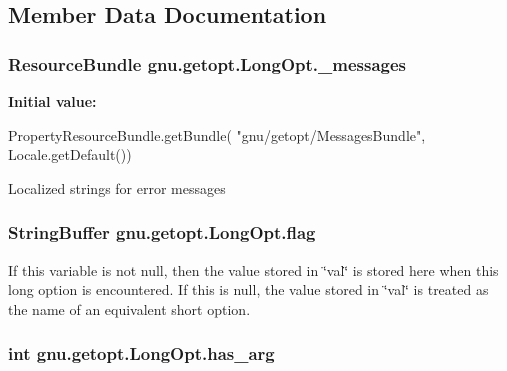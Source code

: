 \subsection{Member Data Documentation}
\hypertarget{classgnu_1_1getopt_1_1_long_opt_af5966405b1f9dff812b8ee0641a4c13f}{
\subsubsection[{\_\-messages}]{\setlength{\rightskip}{0pt plus 5cm}ResourceBundle {\bf gnu.getopt.LongOpt.\_\-messages}}}
\label{classgnu_1_1getopt_1_1_long_opt_af5966405b1f9dff812b8ee0641a4c13f}
{\bfseries Initial value:}
\begin{DoxyCode}
 PropertyResourceBundle.getBundle(
                            "gnu/getopt/MessagesBundle", Locale.getDefault())
\end{DoxyCode}
Localized strings for error messages \hypertarget{classgnu_1_1getopt_1_1_long_opt_ac9a762144573588ca158d909f65c03e9}{
\subsubsection[{flag}]{\setlength{\rightskip}{0pt plus 5cm}StringBuffer {\bf gnu.getopt.LongOpt.flag}}}
\label{classgnu_1_1getopt_1_1_long_opt_ac9a762144573588ca158d909f65c03e9}
If this variable is not null, then the value stored in \char`\"{}val\char`\"{} is stored here when this long option is encountered. If this is null, the value stored in \char`\"{}val\char`\"{} is treated as the name of an equivalent short option. \hypertarget{classgnu_1_1getopt_1_1_long_opt_a7a8d529950461c0c30ef2df667df017b}{
\subsubsection[{has\_\-arg}]{\setlength{\rightskip}{0pt plus 5cm}int {\bf gnu.getopt.LongOpt.has\_\-arg}}}
